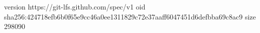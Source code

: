 version https://git-lfs.github.com/spec/v1
oid sha256:424718efb6b0f65e9cc46a0ee1311829c72e37aaff6047451d6defbba69c8ac9
size 298090
